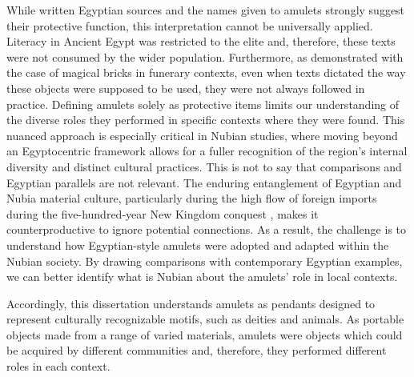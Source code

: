 While written Egyptian sources and the names given to amulets strongly suggest their protective function, this interpretation cannot be universally applied. Literacy in Ancient Egypt was restricted to the elite and, therefore, these texts were not consumed by the wider population. Furthermore, as \textcites{régenWhenBookDead2010, régenArchaeologyBookDead2017} demonstrated with the case of magical bricks in funerary contexts, even when texts dictated the way these objects were supposed to be used, they were not always followed in practice. Defining amulets solely as protective items limits our understanding of the diverse roles they performed in specific contexts where they were found. This nuanced approach is especially critical in Nubian studies, where moving beyond an Egyptocentric framework allows for a fuller recognition of the region’s internal diversity and distinct cultural practices. This is not to say that comparisons and Egyptian parallels are not relevant. The enduring entanglement of Egyptian and Nubia material culture, particularly during the high flow of foreign imports during the five-hundred-year New Kingdom conquest \parencites{lemosMaterialCultureColonization2020}, makes it counterproductive to ignore potential connections. As a result, the challenge is to understand how Egyptian-style amulets were adopted and adapted within the Nubian society. By drawing comparisons with contemporary Egyptian examples, we can better identify what is Nubian about the amulets’ role in local contexts.


Accordingly, this dissertation understands amulets as pendants designed to represent culturally recognizable motifs, such as deities and animals. As portable objects made from a range of varied materials, amulets were objects which could be acquired by different communities and, therefore, they performed different roles in each context.


